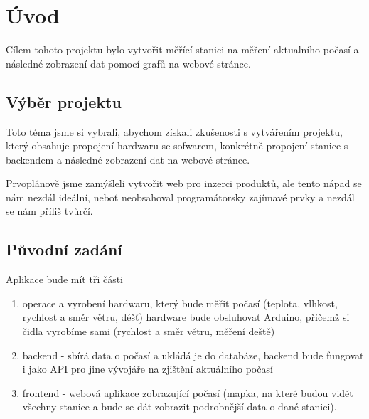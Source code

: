 \section{Úvod}
Cílem tohoto projektu bylo vytvořit měřící stanici na měření aktualního počasí a následné zobrazení dat pomocí grafů na webové stránce.

\subsection{Výběr projektu}
Toto téma jsme si vybrali, abychom získali zkušenosti s vytvářením projektu, 
který obsahuje propojení hardwaru se sofwarem, konkrétně propojení stanice s backendem a následné zobrazení dat na webové stránce. 

Prvoplánově jsme zamýšleli vytvořit web pro inzerci produktů,
ale tento nápad se nám nezdál ideální, neboť neobsahoval programátorsky zajímavé prvky a nezdál se nám příliš tvůrčí.

\subsection{Původní zadání}
Aplikace bude mít tři části
\begin{enumerate}
    \item operace a vyrobení hardwaru, který bude měřit počasí (teplota, vlhkost, rychlost a směr větru, déšť) hardware bude obsluhovat Arduino, přičemž si čidla vyrobíme sami (rychlost a směr větru, měření deště)
    \item backend - sbírá data o počasí a ukládá je do databáze, backend bude fungovat i jako API pro jine vývojáře na zjištění aktuálního počasí
    \item frontend - webová aplikace zobrazující počasí (mapka, na které budou vidět všechny stanice a bude se dát zobrazit podrobnější data o dané stanici).
\end{enumerate}
